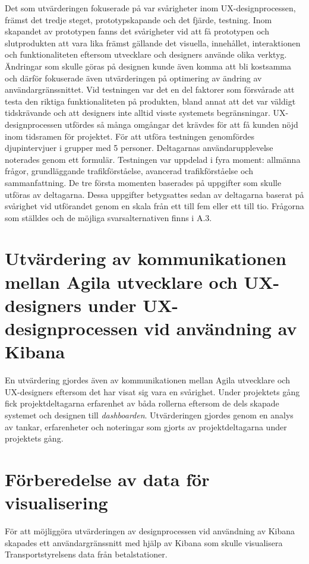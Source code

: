 \documentclass[12pt]{kththesis}
\begin{document}
Det som utvärderingen fokuserade på var svårigheter inom UX-designprocessen, främst det tredje steget, prototypskapande och det fjärde, testning. Inom skapandet av prototypen fanns det svårigheter vid att få prototypen och slutprodukten att vara lika främst gällande det visuella, innehållet, interaktionen och funktionaliteten eftersom utvecklare och designers använde olika verktyg. Ändringar som skulle göras på designen kunde även komma att bli kostsamma och därför fokuserade även utvärderingen på optimering av ändring av användargränssnittet. Vid testningen var det en del faktorer som försvårade att testa den riktiga funktionaliteten på produkten, bland annat att det var väldigt tidskrävande och att designers inte alltid visste systemets begränsningar. UX-designprocessen utfördes så många omgångar det krävdes för att få kunden nöjd inom tidsramen för projektet. För att utföra testningen genomfördes djupintervjuer i grupper med 5 personer. Deltagarnas användarupplevelse noterades genom ett formulär. Testningen var uppdelad i fyra moment: allmänna frågor, grundläggande trafikförståelse, avancerad trafikförståelse och sammanfattning. De tre första momenten baserades på uppgifter som skulle utföras av deltagarna. Dessa uppgifter betygsattes sedan av deltagarna baserat på svårighet vid utförandet genom en skala från ett till fem eller ett till tio. Frågorna som ställdes och de möjliga svarsalternativen finns i A.3.


\section{Utvärdering av kommunikationen mellan Agila utvecklare och UX-designers under UX-designprocessen vid användning av Kibana}

En utvärdering gjordes även av kommunikationen mellan Agila utvecklare och UX-designers eftersom det har visat sig vara en svårighet. Under projektets gång fick projektdeltagarna erfarenhet av båda rollerna eftersom de dels skapade systemet och designen till \textit{dashboarden}. Utvärderingen gjordes genom en analys av tankar, erfarenheter och noteringar som gjorts av projektdeltagarna under projektets gång. 


\section{Förberedelse av data för visualisering}

För att möjliggöra utvärderingen av designprocessen vid användning av Kibana skapades ett användargränssnitt med hjälp av Kibana som skulle visualisera Transportstyrelsens data från betalstationer.
\end{document}

